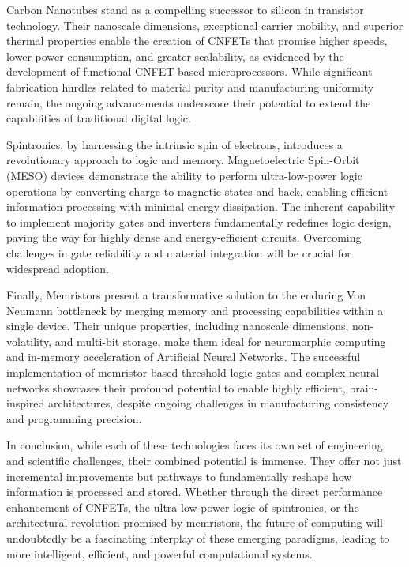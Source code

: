 \documentclass[sigconf]{acmart}
\begin{document}
Carbon Nanotubes stand as a compelling successor to silicon in 
transistor technology. Their nanoscale dimensions, exceptional 
carrier mobility, and superior thermal properties enable the 
creation of CNFETs that promise higher speeds, lower power 
consumption, and greater scalability, as evidenced by the 
development of functional CNFET-based microprocessors. While 
significant fabrication hurdles related to material purity and 
manufacturing uniformity remain, the ongoing advancements 
underscore their potential to extend the capabilities of 
traditional digital logic.

Spintronics, by harnessing the intrinsic spin of electrons, 
introduces a revolutionary approach to logic and memory. 
Magnetoelectric Spin-Orbit (MESO) devices demonstrate the 
ability to perform ultra-low-power logic operations by converting 
charge to magnetic states and back, enabling efficient information 
processing with minimal energy dissipation. The inherent 
capability to implement majority gates and inverters fundamentally 
redefines logic design, paving the way for highly dense and 
energy-efficient circuits. Overcoming challenges in gate 
reliability and material integration will be crucial for 
widespread adoption.

Finally, Memristors present a transformative solution to the 
enduring Von Neumann bottleneck by merging memory and processing 
capabilities within a single device. Their unique properties, 
including nanoscale dimensions, non-volatility, and multi-bit 
storage, make them ideal for neuromorphic computing and in-memory 
acceleration of Artificial Neural Networks. The successful 
implementation of memristor-based threshold logic gates and 
complex neural networks showcases their profound potential to 
enable highly efficient, brain-inspired architectures, despite 
ongoing challenges in manufacturing consistency and programming 
precision.

In conclusion, while each of these technologies faces its own set 
of engineering and scientific challenges, their combined potential
is immense. They offer not just incremental improvements but 
pathways to fundamentally reshape how information is processed 
and stored. Whether through the direct performance enhancement of 
CNFETs, the ultra-low-power logic of spintronics, or the 
architectural revolution promised by memristors, the future of 
computing will undoubtedly be a fascinating interplay of these 
emerging paradigms, leading to more intelligent, efficient, and 
powerful computational systems.
\end{document}

